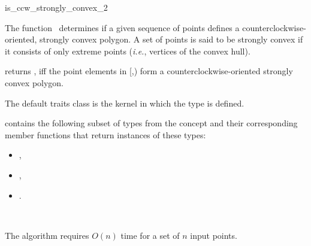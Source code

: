 

\begin{ccRefFunction}{is_ccw_strongly_convex_2}  

\ccDefinition
  
The function \ccRefName\ determines if a given sequence of points defines
a counterclockwise-oriented, strongly convex polygon.  
A set of points is said to be strongly convex 
if it consists of only extreme points
(\textit{i.e.}, vertices of the convex hull).


           {returns , iff the point elements in 
            [,)
            form a counterclockwise-oriented strongly convex polygon.
           }


The default traits class  is the kernel in which the
type  is defined.

 contains the following subset of types from
the concept  and their corresponding member
functions that return instances of these types:
\begin{itemize}
   \item {}, 
   \item {},
   \item {}.
\end{itemize}


\ccSeeAlso

 \\


\ccImplementation

The algorithm requires $O(n)$ time for a set of $n$ input points.


\end{ccRefFunction}


